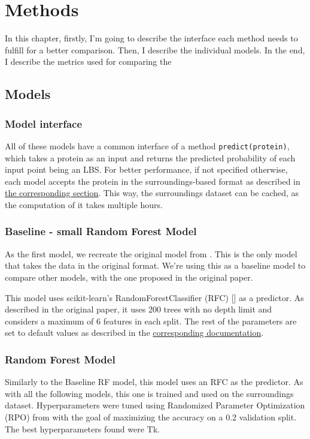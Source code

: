 \chapter{Methods}

In this chapter,  firstly, I'm going to describe the interface each method needs to fulfill for a better comparison. Then, I describe the individual models. In the end, I describe the metrics used for comparing the 
\section{Models}
\subsection{Model interface}

All of these models have a common interface of a method  \texttt{predict(protein)}, which takes a protein as an input and returns the predicted probability of each input point being an LBS. For better performance, if not specified otherwise, each model accepts the protein in the surroundings-based format as described in \hyperref[Surroundings]{the corresponding section}. This way, the surroundings dataset can be cached, as the computation of it takes multiple hours.


\subsection{Baseline - small Random Forest Model}
As the first model, we recreate the original model from \cite{P2RANK}. This is the only model that takes the data in the original format. We're using this as a baseline model to compare other models, with the one proposed in the original paper.

This model uses scikit-learn's RandomForestClassifier (RFC) [\cite{scikit-learn}] as a predictor. As described in the original paper, it uses 200 trees with no depth limit and considers a maximum of 6 features in each split. The rest of the parameters are set to default values as described in the \hyperlink{https://scikit-learn.org/1.1/modules/generated/sklearn.ensemble.RandomForestClassifier.html}{corresponding documentation}.


\subsection{Random Forest Model}

Similarly to the Baseline RF model, this model uses an RFC as the predictor. As with all the following models, this one is trained and used on the surroundings dataset. Hyperparameters were tuned using Randomized Parameter Optimization (RPO) from \cite{scikit-learn} with the goal of maximizing the accuracy on a 0.2 validation split. The best hyperparameters found were Tk.

